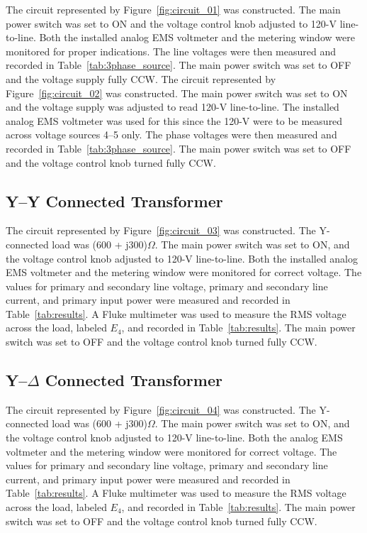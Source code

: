 \documentclass{article}
\begin{document}
\label{part1} The circuit represented by Figure~\ref{fig:circuit_01} was
constructed.  The main power switch was set to ON and the voltage control knob
adjusted to 120-V line-to-line. Both the installed analog EMS voltmeter and the
metering window were monitored for proper indications. The line voltages were
then measured and recorded in Table~\ref{tab:3phase_source}. The main power
switch was set to OFF and the voltage supply fully {CCW}. The circuit
represented by Figure~\ref{fig:circuit_02} was constructed. The main power
switch was set to ON and the voltage supply was adjusted to read 120-V
line-to-line. The installed analog EMS voltmeter was used for this since the
120-V were to be measured across voltage sources 4--5 only. The phase voltages
were then measured and recorded in Table~\ref{tab:3phase_source}.  The main
power switch was set to OFF and the voltage control knob turned fully CCW.

\subsection{Y--Y Connected Transformer}

\label{part2} The circuit represented by Figure~\ref{fig:circuit_03} was
constructed.  The Y-connected load was (600 + j300)$\Omega$. The main power
switch was set to ON, and the voltage control knob adjusted to 120-V
line-to-line. Both the installed analog EMS voltmeter and the metering window
were monitored for correct voltage.  The values for primary and secondary line
voltage, primary and secondary line current, and primary input power were
measured and recorded in Table~\ref{tab:results}. A Fluke multimeter was used
to measure the RMS voltage across the load, labeled $E_4$, and recorded in
Table~\ref{tab:results}.  The main power switch was set to OFF and the voltage
control knob turned fully CCW.

\subsection{Y--$\Delta$ Connected Transformer}

\label{part3} The circuit represented by Figure~\ref{fig:circuit_04} was
constructed.  The Y-connected load was (600 + j300)$\Omega$. The main power
switch was set to ON, and the voltage control knob adjusted to 120-V
line-to-line. Both the analog EMS voltmeter and the metering window were
monitored for correct voltage. The values for primary and secondary line
voltage, primary and secondary line current, and primary input power were
measured and recorded in Table~\ref{tab:results}. A Fluke multimeter was used
to measure the RMS voltage across the load, labeled $E_4$, and recorded in
Table~\ref{tab:results}.  The main power switch was set to OFF and the voltage
control knob turned fully CCW.
\end{document}
